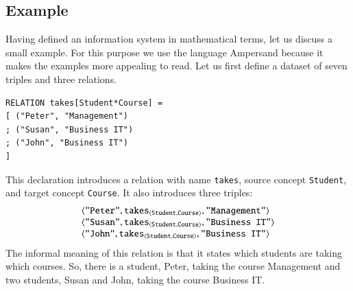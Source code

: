 \documentclass{elsarticle}
\begin{document}
\subsection{Example}
\label{old IS}
   Having defined an information system in mathematical terms, let us discuss a small example.
   For this purpose we use the language Ampersand
   because it makes the examples more appealing to read.
   Let us first define a dataset of seven triples and three relations.
\begin{verbatim}
RELATION takes[Student*Course] =
[ ("Peter", "Management")
; ("Susan", "Business IT")
; ("John", "Business IT")
]
\end{verbatim}
   This declaration introduces a relation with name \verb#takes#,
   source concept \verb#Student#, and
   target concept \verb#Course#.
   It also introduces three triples:
\[\begin{array}{l}
   \langle{\text{\tt "Peter"}},{\text{\it \text{\tt takes}\/}_{\langle{\text{\tt Student}},{\text{\tt Course}}\rangle}},{\text{\tt "Management"}}\rangle\\
   \langle{\text{\tt "Susan"}},{\text{\it \text{\tt takes}\/}_{\langle{\text{\tt Student}},{\text{\tt Course}}\rangle}},{\text{\tt "Business IT"}}\rangle\\
   \langle{\text{\tt "John"}},{\text{\it \text{\tt takes}\/}_{\langle{\text{\tt Student}},{\text{\tt Course}}\rangle}},{\text{\tt "Business IT"}}\rangle
\end{array}\]
   The informal meaning of this relation is that it states which students are taking which courses.
   So, there is a student, Peter, taking the course Management and two students, Susan and John, taking the course Business IT.
\end{document}

